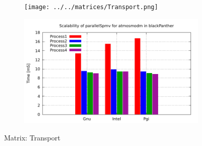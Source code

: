 \begin{figure} [ht!]
    \centering
    \captionsetup{justification=centering, singlelinecheck=false}
    \begin{subfigure}{.65\textwidth}
      \centering
      \hspace*{-3.5cm} 
      \texttt{[image: ../../matrices/Transport.png]}
      \label{fig:Transport_matrix}
    \end{subfigure}%
    \begin{subfigure}{.65\textwidth}
      \centering
      \hspace*{-6.0cm} 
      \includegraphics[page=9, width=0.95\linewidth]{../plots/blackPanther.pdf}
      \label{fig:Transport_performance}
    \end{subfigure}
\caption{Matrix: Transport}
\label{fig:Transport}
\end{figure}


\medskip
